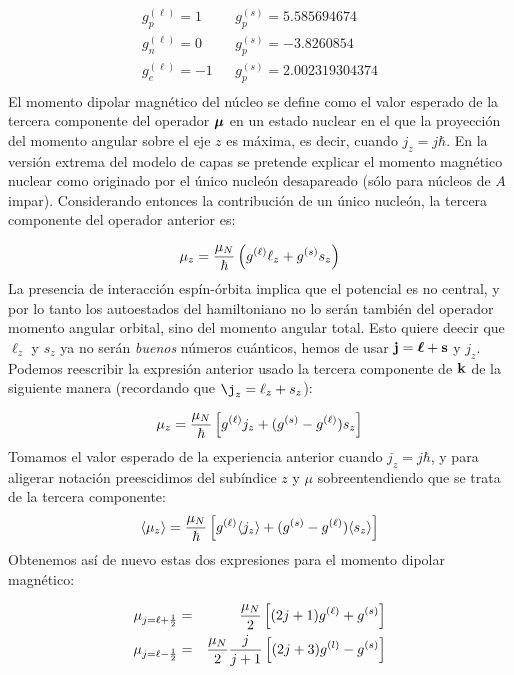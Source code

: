 \begin{eqnarray}
	g_p^{(\ell)} = 1 & & g_p^{(s)} = \num{5.585694674} \\
	g_n^{(\ell)} = 0 & & g_p^{(s)} = \num{-3.8260854} \\
	g_e^{(\ell)} = -1 & & g_p^{(s)} = \num{2.002319304374} \\
\end{eqnarray}
El momento dipolar magnético del núcleo se define como el valor esperado de la tercera componente del operador $\boldsymbol{\mu}$ en un estado nuclear en el que la proyección del momento angular sobre el eje $z$ es máxima, es decir, cuando $j_z=j\hbar$. En la versión extrema del modelo de capas se pretende explicar el momento magnético nuclear como originado por el único nucleón desapareado (sólo para núcleos de $A$ impar). Considerando entonces la contribución de un único nucleón, la tercera componente del operador anterior es:

\begin{equation}
	\mu_z = \frac{\mu_N}{\hbar} \left( g^{(\ell)} \ell_z + g^{(s)} s_z \right)
\end{equation}
La presencia de interacción espín-órbita implica que el potencial es no central, y por lo tanto los autoestados del hamiltoniano no lo serán también del operador momento angular orbital, sino del momento angular total. Esto quiere deecir que $\ell_z$ y $s_z$ ya no serán \textit{buenos} números cuánticos, hemos de usar $\mathbf{j}=\boldsymbol{\ell}+\mathbf{s}$ y $j_z$. Podemos reescribir la expresión anterior usado la tercera componente de $\mathbf{k}$ de la siguiente manera (recordando que $\j_z=\ell_z + s_z$):

\begin{equation}
	\mu_z = \frac{\mu_N}{\hbar} \left[ g^{(\ell)}j_z + (g^{(s)}-g^{(\ell)})  s_z \right]
\end{equation}
Tomamos el valor esperado de la experiencia anterior cuando $j_z=j\hbar$, y para aligerar notación preescidimos del subíndice $z$ y $\mu$ sobreentendiendo que se trata de la tercera componente:
\begin{equation}
	\langle \mu_z \rangle = \frac{\mu_N}{\hbar} \left[ g^{(\ell)} \langle j_z \rangle + (g^{(s)}-g^{(\ell)}) \langle s_z \rangle \right]
\end{equation}
Obtenemos así de nuevo estas dos expresiones para el momento dipolar magnético:

\begin{eqnarray}
	\mu_{j=\ell+\frac{1}{2}} & = & \frac{\mu_N}{2} \left[ (2j+1)g^{(\ell)} + g^{(s)} \right] \\
	\mu_{j=\ell-\frac{1}{2}} & = & \frac{\mu_N}{2} \frac{j}{j+1} \left[ (2j+3)g^{(l)} - g^{(s)}  \right]
\end{eqnarray}

